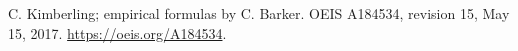 C. Kimberling; empirical formulas by C. Barker.
OEIS A184534, revision 15, May 15, 2017.
\url{https://oeis.org/A184534}.
